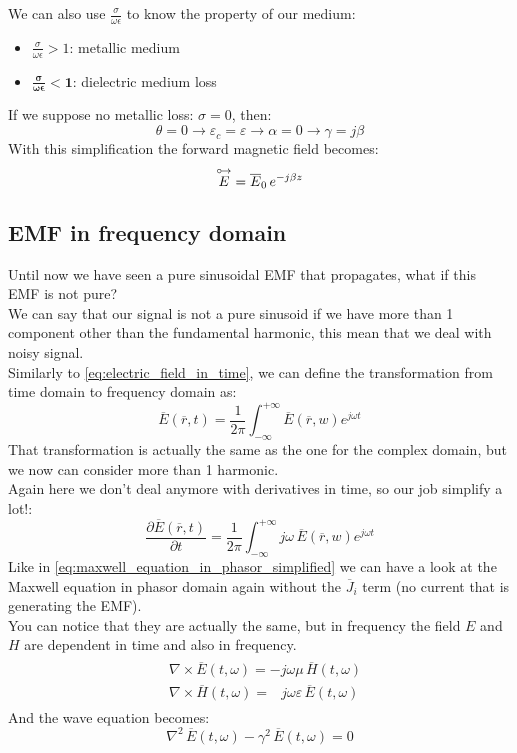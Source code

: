 We can also use $\frac{\sigma}{\omega \epsilon}$ to know the property of our medium:
\begin{itemize}
    \item $\frac{\sigma}{\omega \epsilon}> 1$: metallic medium
    \item $\bm{\frac{\sigma}{\omega \epsilon}< 1}$: dielectric medium loss
\end{itemize}
If we suppose no metallic loss: $\sigma = 0$, then:
\begin{equation*}
    \theta=0\rightarrow\varepsilon_c=\varepsilon\rightarrow\alpha=0\rightarrow\gamma =j\beta
\end{equation*}
With this simplification the forward magnetic field becomes:
\begin{equation}
    \overset{\mathbin {{\circ \mkern-2.5mu\rightarrow}}}{E}=\overline{E}_{0}\, e^{-j\beta z}
\end{equation}
\subsection*{EMF in frequency domain}
Until now we have seen a pure sinusoidal EMF that propagates, what if this EMF is not pure?\\
We can say that our signal is not a pure sinusoid if we have more than 1 component other than the fundamental harmonic, this mean that we deal with noisy signal.\\
Similarly to \cref{eq:electric_field_in_time}, we can define the transformation from time domain to frequency domain as:
\begin{equation}
    \overline{E}(\overline{r},t)=\frac{1}{2\pi}\int_{-\infty}^{+\infty}\overline{E}(\overline{r},w)e^{j\omega t}
\end{equation}
That transformation is actually the same as the one for the complex domain, but we now can consider more than 1 harmonic.\\
Again here we don't deal anymore with derivatives in time, so our job simplify a lot!:
\begin{equation}
    \frac{\partial\overline{E}(\overline{r},t)}{\partial t}=\frac{1}{2\pi}\int_{-\infty}^{+\infty}j\omega\,\overline{E}(\overline{r},w)e^{j\omega t}
\end{equation}
Like in \cref{eq:maxwell_equation_in_phasor_simplified} we can have a look at the Maxwell equation in phasor domain again without the $\overline{J}_i$ term (no current that is generating the EMF).\\
You can notice that they are actually the same, but in frequency the field $E$ and $H$ are dependent in time and also in frequency.
\begin{align}
    \begin{split}
        &\nabla\times\overline{E}(t,\omega)=-j\omega\mu\,\overline{H}(t,\omega)\\[5pt]
        &\nabla\times\overline{H}(t,\omega)=\;\;\,j\omega \varepsilon\,\overline{E}(t,\omega)
    \end{split}
\end{align}
And the wave equation becomes:
\begin{equation}
    \nabla^2\,\overline{E}(t,\omega)-\gamma^2\,\overline{E}(t,\omega)=0
\end{equation}
